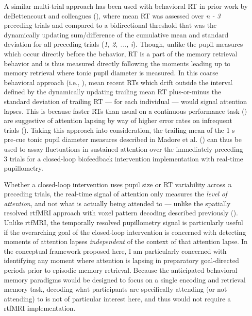 A similar multi-trial approach has been used with behavioral RT in prior work by deBettencourt and colleagues (\cite*{debettencourt2019real}), where mean RT was assessed over \emph{n - 3} preceding trials and compared to a bidirectional threshold that was the dynamically updating sum/difference of the cumulative mean and standard deviation for all preceding trials (\emph{1, 2, ..., i}). Though, unlike the pupil measures which occur directly before the behavior, RT is a part of the memory retrieval behavior and is thus measured directly following the moments leading up to memory retrieval where tonic pupil diameter is measured. In this coarse behavioral approach (i.e., \cite{debettencourt2019real}), mean recent RTs which drift outside the interval defined by the dynamically updating trailing mean RT plus-or-minus the standard deviation of trailing RT --- for each individual --- would signal attention lapses. This is because faster RTs than usual on a continuous performance task (\cite{megan2015closed, debettencourt2018forgetting, robertson1997oops, rosenberg2013sustaining}) are suggestive of attention lapsing by way of higher error rates on infrequent trials (\cite{megan2015closed, debettencourt2018forgetting, esterman2013zone}). Taking this approach into consideration, the trailing mean of the 1-s pre-cue tonic pupil diameter measures described in Madore et al. (\cite*{madore2020memory}) can thus be used to assay fluctuations in sustained attention over the immediately preceding 3 trials for a closed-loop biofeedback intervention implementation with real-time pupillometry.

Whether a closed-loop intervention uses pupil size or RT variability across \emph{n} preceding trials, the real-time signal of attention only measures the \emph{level of attention}, and not what is actually being attended to --- unlike the spatially resolved rtfMRI approach with voxel pattern decoding described previously (\cite{megan2015closed, debettencourt2019real, rosenberg2013sustaining, yoss1970pupil}). Unlike rtfMRI, the temporally resolved pupillometry signal is particularly useful if the overarching goal of the closed-loop intervention is concerned with detecting moments of attention lapses \emph{independent} of the context of that attention lapse. In the conceptual framework proposed here, I am particularly concerned with identifying any moment where attention is lapsing in preparatory goal-directed periods prior to episodic memory retrieval. Because the anticipated behavioral memory paradigms would be designed to focus on a single encoding and retrieval memory task, decoding what participants are specifically attending (or not attending) to is not of particular interest here, and thus would not require a rtfMRI implementation.

